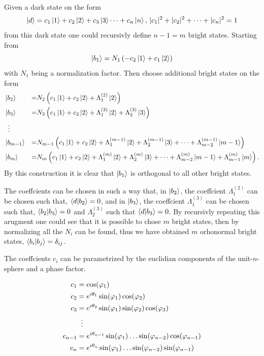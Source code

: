 Given a dark state on the form 
\begin{equation}
\ket{d} = c_1\ket{1} + c_2\ket{2} + c_3\ket{3} \dots + c_{n}\ket{n},\, |c_1|^2 + |c_2|^2 + \dots + |c_{n}|^2 = 1
\end{equation}
from this dark state one could recursivly define $n-1 = m$ bright states.
Starting from
\begin{equation}
\ket{b_1} = N_1\left(-c_2\ket{1} + c_1\ket{2}\right)
\end{equation}
with $N_1$ being a normalization factor. Then choose additional bright states on the form
\begin{equation}
\begin{aligned}
&\ket{b_2} &=& N_2 \left(c_1\ket{1} + c_2\ket{2} + \Lambda_{1}^{(2)}\ket{2}  \right)
\\
&\ket{b_3} &=&  N_3 \left(c_1\ket{1} + c_2\ket{2} + \Lambda_{1}^{(3)}\ket{2} + \Lambda_{2}^{(3)}\ket{3} \right)
\\
&\;\;\vdots
\\
&\ket{b_{m-1}} &=& N_{m-1} \left( c_1\ket{1} + c_2\ket{2} + \Lambda_{1}^{(m-1)}\ket{2} + \Lambda_{2}^{(m-1)}\ket{3} + \dots + \Lambda_{m-2}^{(m-1)}\ket{m-1} \right)
\\
&\ket{b_{m}} &=& N_m \left( c_1\ket{1} + c_2\ket{2} + \Lambda_{1}^{(m)}\ket{2} + \Lambda_{2}^{(m)}\ket{3} + \dots + \Lambda_{m-2}^{(m)}\ket{m-1} + \Lambda_{m-1}^{(m)}\ket{m} \right).
\end{aligned}
\end{equation}
By this construction it is clear that $\ket{b_1}$ is orthogonal to all other bright states.

The coeffcients can be chosen in such a way that, in $\ket{b_2}$, the coeffcient $\Lambda_1^{(2)}$ can be chosen such that, $\bra{d}\ket{b_2} = 0$, and in $\ket{b_3}$, the coeffcient $\Lambda_1^{(3)}$ can be chosen such that, $\bra{b_2}\ket{b_3} = 0$ and $\Lambda_2^{(3)}$ such that $\bra{d}\ket{b_3} = 0$. By recursivly repeating this arugment one could see that it is possible to chose $m$ bright states, then by normalizing all the $N_i$ can be found, thus we have obtained $m$ orhonormal bright states, $\bra{b_i}\ket{b_j} = \delta_{ij}$.

The coeffcients $c_i$ can be parametrized by the euclidian components of the unit-$n$-sphere and a phase factor.

\begin{equation}
\begin{aligned}
c_1 &= \cos(\varphi_1)
\\ 
c_2 &= e^{i\theta_1}\sin(\varphi_1)\cos(\varphi_2)
\\ 
c_3 &= e^{i\theta_2}\sin(\varphi_1)\sin(\varphi_2)\cos(\varphi_3)
\\
&\hspace{2mm}\vdots
\\
c_{n-1} &= e^{i\theta_{n-1}}\sin(\varphi_1)\dots\sin(\varphi_{n-2})\cos(\varphi_{n-1})
\\
c_{n} &= e^{i\theta_{n}}\sin(\varphi_1)\dots\sin(\varphi_{n-2})\sin(\varphi_{n-1})
\end{aligned}
\end{equation}

